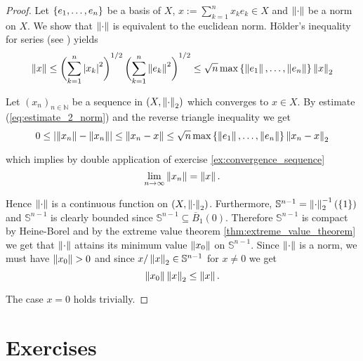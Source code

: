 \begin{proof}
	Let $\cbr[0]{e_1,\dots,e_n}$ be a basis of $X$, $x := \sum_{k = 1}^n x_ke_k \in X$ and $\norm[0]{\cdot}$ be a norm on $X$. We show that $\norm[0]{\cdot}$ is equivalent to the euclidean norm. H\"older's inequality for series (see \cite[224]{elstrodt:mass:2011}) yields
	\begin{equation}
		\norm[0]{x} \leq \del[3]{\sum_{k = 1}^n \abs[0]{x_k}^2}^{1/2} \del[3]{\sum_{k = 1}^n \norm[0]{e_k}^2}^{1/2}\leq \sqrt{n}\max\cbr[0]{\norm[0]{e_1},\dots,\norm[0]{e_n}}\norm[0]{x}_2
		\label{eq:estimate_2_norm}
	\end{equation}

	Let $(x_n)_{n \in \mathbb{N}}$ be a sequence in $(X,\norm[0]{\cdot}_2)$ which converges to $x \in X$. By estimate (\ref{eq:estimate_2_norm}) and the reverse triangle inequality we get
	\begin{equation}
		0 \leq \abs[0]{\norm[0]{x_n} - \norm[0]{x_n}} \leq \norm[0]{x_n - x} \leq \sqrt{n}\max\cbr[0]{\norm[0]{e_1},\dots,\norm[0]{e_n}}\norm[0]{x_n - x}_2
	\end{equation}

	\noindent which implies by double application of exercise \ref{ex:convergence_sequence}
	\begin{equation}
		\lim_{n \to \infty} \norm[0]{x_n} = \norm[0]{x}.
	\end{equation}

	Hence $\norm[0]{\cdot}$ is a continuous function on $(X,\norm[0]{\cdot}_2)$. Furthermore, $\mathbb{S}^{n - 1} = \norm[0]{\cdot}^{-1}_2(\cbr[0]{1})$ and $\mathbb{S}^{n-1}$ is clearly bounded since $\mathbb{S}^{n-1} \subseteq \overline{B}_1(0)$. Therefore $\mathbb{S}^{n - 1}$ is compact by Heine-Borel and by the extreme value theorem \ref{thm:extreme_value_theorem} we get that $\norm[0]{\cdot}$ attains its minimum value $\norm[0]{x_0}$ on $\mathbb{S}^{n-1}$. Since $\norm[0]{\cdot}$ is a norm, we must have $\norm[0]{x_0} > 0$ and since $x/\norm[0]{x}_2 \in \mathbb{S}^{n - 1}$ for $x \neq 0$ we get 
	\begin{equation}
		\norm[0]{x_0} \norm[0]{x}_2 \leq \norm[0]{x}.
	\end{equation}

	The case $x = 0$ holds trivially.
\end{proof}

\section*{Exercises}

